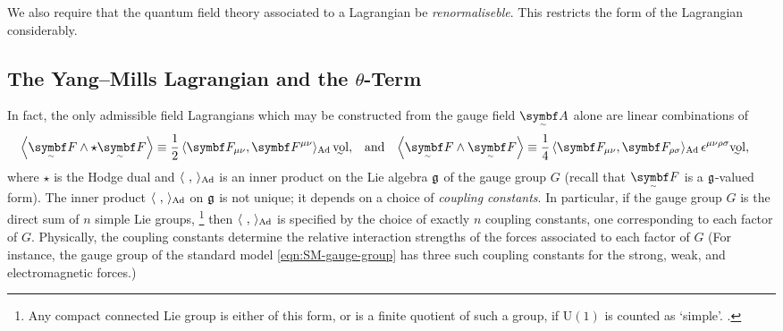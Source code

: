 We also require that the quantum field theory associated to a Lagrangian be \emph{renormaliseble}.
This restricts the form of the Lagrangian considerably.


\subsection{The Yang--Mills Lagrangian and the \texorpdfstring{$\theta$-Term}{θ-Term}}




In fact, the only admissible field Lagrangians which may be constructed from the gauge field $\tsbm A$ alone are linear combinations of
\begin{align}
	\ang{\tsbm F \wedge \star\tsbm F} &\equiv \frac12\angg{\bm F_{\mu\nu}, \bm F^{\mu\nu}}\vol
,&	&\text{and}
&	\ang{\tsbm F \wedge \tsbm F} &\equiv \frac14\angg{\bm F_{\mu\nu}, \bm F_{\rho\sigma}}\epsilon^{\mu\nu\rho\sigma}\vol
,\end{align}
where $\star$ is the Hodge dual and $\angg{\ ,\ }$ is an inner product on the Lie algebra $\frak g$ of the gauge group $G$ (recall that $\tsbm F$ is a $\frak g$-valued form).
The inner product $\angg{\ ,\ }$ on $\frak g$ is not unique; it depends on a choice of \emph{coupling constants}.
In particular, if the gauge group $G$ is the direct sum of $n$ simple Lie groups,%
\footnote{
	Any compact connected Lie group is either of this form, or is a finite quotient of such a group, if $\mathrm U(1)$ is counted as `simple'. \cite[§\,2.4.3]{Hamilton_2017}.
}
then $\angg{\ ,\ }$ is specified by the choice of exactly $n$ coupling constants, one corresponding to each factor of $G$.
Physically, the coupling constants determine the relative interaction strengths of the forces associated to each factor of $G$ \cite[§\,2.5]{Hamilton_2017}
(For instance, the gauge group of the standard model \eqref{eqn:SM-gauge-group} has three such coupling constants for the strong, weak, and electromagnetic forces.)

